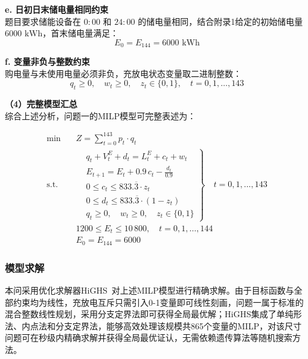 \documentclass[12pt,a4paper]{ctexart}
\theoremstyle{definition}
\theoremstyle{plain}
\theoremstyle{remark}
\begin{document}
\noindent\textbf{e. 日初日末储电量相同约束}\\[4pt]
\indent 题目要求储能设备在 $0:00$ 和 $24:00$ 的储电量相同，结合附录1给定的初始储电量 $6000\text{ kWh}$，首末储电量满足：
\begin{equation}
  E_0 = E_{144} = 6000\text{ kWh}
  \label{eq:q1_boundary}
\end{equation}

\noindent\textbf{f. 变量非负与整数约束}\\[4pt]
\indent 购电量与未使用电量必须非负，充放电状态变量取二进制整数：
\begin{equation}
  q_t \geq 0, \quad w_t \geq 0, \quad z_t \in \{0, 1\}, \quad t = 0, 1, \ldots, 143
  \label{eq:q1_nonneg}
\end{equation}

\noindent\textbf{（4）完整模型汇总}\\[6pt]
\indent 综合上述分析，问题一的MILP模型可完整表述为：

\begin{equation}
\begin{aligned}
  \min \quad & \boxed{Z = \sum_{t=0}^{143} p_t \cdot q_t} \\[6pt]
  \text{s.t.} \quad 
  & \left.
  \begin{aligned}
    & q_t + V_t^{E} + d_t = L_t^{E} + c_t + w_t \\
    & E_{t+1} = E_t + 0.9\,c_t - \frac{d_t}{0.9} \\
    & 0 \leq c_t \leq 833.\overline{3} \cdot z_t \\
    & 0 \leq d_t \leq 833.\overline{3} \cdot (1 - z_t) \\
    & q_t \geq 0, \quad w_t \geq 0, \quad z_t \in \{0, 1\}
  \end{aligned}
  \right\} \quad t = 0, 1, \ldots, 143 \\[6pt]
  & 1200 \leq E_t \leq 10\,800, \quad t = 0, 1, \ldots, 144 \\[4pt]
  & E_0 = E_{144} = 6000
\end{aligned}
\label{eq:q1_full_model}
\end{equation}


\subsubsection{模型求解}

本问采用优化求解器HiGHS~\cite{huangfu2018parallelizing}对上述MILP模型进行精确求解。由于目标函数与全部约束均为线性，充放电互斥只需引入0-1变量即可线性刻画，问题一属于标准的混合整数线性规划，采用分支定界法即可获得全局最优解；HiGHS集成了单纯形法、内点法和分支定界法，能够高效处理该规模共865个变量的MILP，对该尺寸问题可在秒级内精确求解并获得全局最优证认，无需依赖遗传算法等随机搜索方法。
\end{document}
